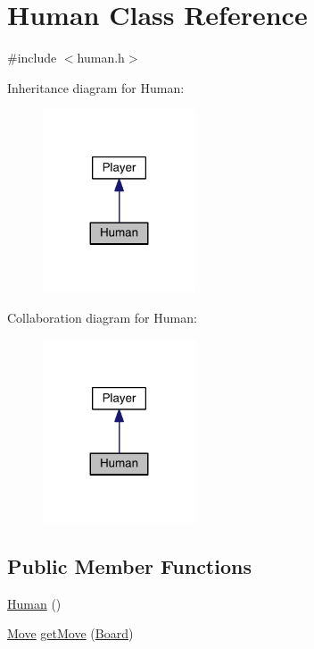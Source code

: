 \hypertarget{class_human}{}\section{Human Class Reference}
\label{class_human}


{\ttfamily \#include $<$human.\+h$>$}



Inheritance diagram for Human\+:\nopagebreak
\begin{figure}[H]
\begin{center}
\leavevmode
\includegraphics[width=128pt]{class_human__inherit__graph}
\end{center}
\end{figure}


Collaboration diagram for Human\+:\nopagebreak
\begin{figure}[H]
\begin{center}
\leavevmode
\includegraphics[width=128pt]{class_human__coll__graph}
\end{center}
\end{figure}
\subsection*{Public Member Functions}
\begin{DoxyCompactItemize}
\item 
\hyperlink{class_human_a4f84fcddcedd434023a001eba00a095c}{Human} ()
\item 
\hyperlink{struct_move}{Move} \hyperlink{class_human_a61228d0fbea51c587ea5383d84b152d8}{get\+Move} (\hyperlink{constants_8h_af901d0acc1572fb0c779f84ddd2c6ce8}{Board})
\end{DoxyCompactItemize}


